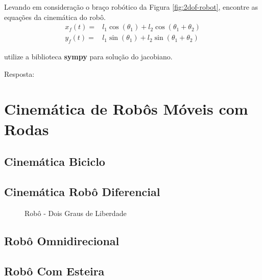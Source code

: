 \begin{shortbox}
    Levando em consideração o braço robótico da Figura \ref{fig:2dof-robot}, encontre as equações da cinemática do robô.
    \begin{equation*}
        \begin{split}
            x_f(t) = & l_1\cos(\theta_1)+l_2\cos(\theta_1 + \theta_2) \\            
            y_f(t) = & l_1\sin(\theta_1)+l_2\sin(\theta_1 + \theta_2)
        \end{split}
    \end{equation*}
    
    utilize a biblioteca \textbf{sympy} para solução do jacobiano.
    \begin{center}
        Resposta:

\end{center}

\end{shortbox} 


\section{Cinemática de Robôs Móveis com Rodas}

\subsection{Cinemática Biciclo}
\subsection{Cinemática Robô Diferencial}

\begin{figure}[!ht]
    
    \caption{Robô - Dois Graus de Liberdade}
    \label{fig:car01}
    \end{figure}

\subsection{Robô Omnidirecional}
\subsection{Robô Com Esteira}


